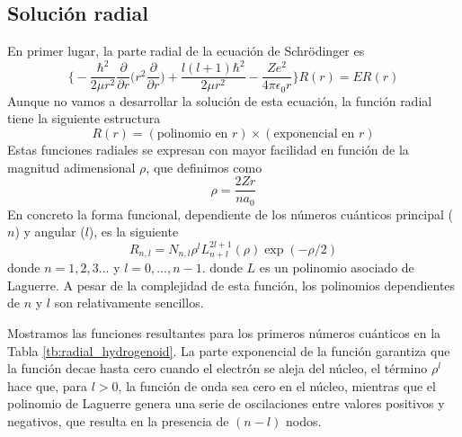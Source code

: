 \subsection{Solución radial}
En primer lugar, la parte radial de la ecuación de Schrödinger es
\begin{equation}
    \bigg\{-\frac{\hbar^2}{2\mu r^2}\frac{\partial}{\partial r}\bigg(r^2\frac{\partial}{\partial r}\bigg) 
    +  \frac{l(l+1)\hbar^2}{2\mu r^2}
    - \frac{Ze^2}{4\pi \epsilon_0r}  \bigg\}
    R(r)
    = ER(r)
\end{equation}
Aunque no vamos a desarrollar la solución de esta ecuación, la función
radial tiene la siguiente estructura
\begin{equation}
    R(r)=(\textrm{polinomio en }r)\times(\textrm{exponencial en }r)
\end{equation}
Estas funciones radiales se expresan con mayor facilidad 
en función de la magnitud adimensional $\rho$, que definimos como
\begin{equation}
    \rho = \frac{2Zr}{na_0}
\end{equation}
En concreto la forma funcional, dependiente de los números
cuánticos principal ($n$) y angular ($l$), es la siguiente
\begin{equation}
  R_{n,l} = N_{n,l}\rho^l L^{2l+1}_{n+l}(\rho)\exp(-\rho/2)
\end{equation}
donde $n=1,2,3...$ y $l=0,...,n-1$. 
donde $L$ es un polinomio asociado de Laguerre. A pesar de la
complejidad de esta función, los polinomios dependientes de $n$ 
y $l$ son relativamente sencillos. 

Mostramos las 
funciones resultantes para los primeros números cuánticos en
la Tabla \ref{tb:radial_hydrogenoid}. La parte exponencial de
la función garantiza que la función decae hasta cero cuando
el electrón se aleja del núcleo, el término $\rho^l$ hace
que, para $l>0$, la función de onda sea cero en el núcleo, 
mientras que el polinomio de Laguerre genera una serie de 
oscilaciones entre valores positivos y negativos, que resulta
en la presencia de $(n-l)$ nodos. 

